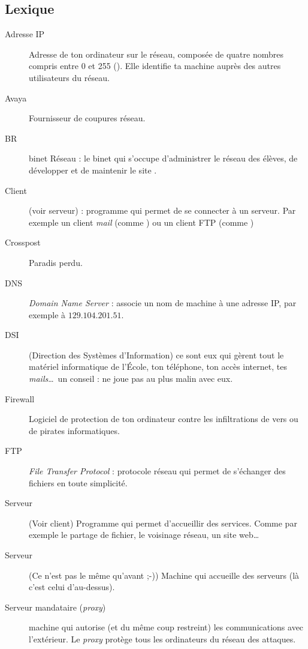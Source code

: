 \subsection{Lexique}

\begin{description}
  \item[Adresse IP] Adresse de ton ordinateur sur le réseau, composée de quatre nombres compris entre 0 et 255  (). Elle identifie ta machine auprès des autres utilisateurs du réseau.
  \item[Avaya] Fournisseur de coupures réseau.
  \item[BR] binet Réseau : le binet qui s'occupe d'administrer le réseau des élèves, de développer et de maintenir le site .
  \item[Client] (voir serveur) : programme qui permet de se connecter à un serveur. Par exemple un client \emph{mail} (comme ) ou un client FTP (comme )
  \item[Crosspost] Paradis perdu.
  \item[DNS] \emph{Domain Name Server} : associe un nom de machine à une adresse IP, par exemple  à  $129.104.201.51$.
  \item[DSI] (Direction des Systèmes d'Information) ce sont eux qui gèrent tout le matériel informatique de l'\'Ecole, ton téléphone, ton accès internet, tes \emph{mails}\ldots\ un conseil : ne joue pas au plus malin avec eux.
  \item[Firewall] Logiciel de protection de ton ordinateur contre les infiltrations de vers ou de pirates informatiques.
  \item[FTP] \emph{File Transfer Protocol} : protocole réseau qui permet de s'échanger des fichiers en toute simplicit\'e.
  \item[Serveur] (Voir client) Programme qui permet d'accueillir des services. Comme par exemple le partage de fichier, le voisinage réseau, un site web\ldots\
  \item[Serveur] (Ce n'est pas le même qu'avant ;-)) Machine qui accueille des serveurs (là c'est celui d'au-dessus).
    \item[Serveur mandataire (\emph{proxy})] machine qui autorise (et du même coup restreint) les communications avec l'extérieur. Le \emph{proxy} protège tous les ordinateurs du réseau des attaques.

\end{description}
